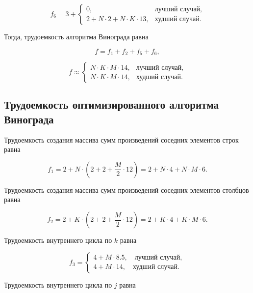 \begin{equation}
	f_6 = 3 + \begin{cases}
		0, & \text{лучший случай}, \\
		2 + N \cdot 2 + N \cdot K \cdot 13, & \text{худший случай}.
	\end{cases}
\end{equation}

Тогда, трудоемкость алгоритма Винограда равна

\begin{equation}
	f = f_1 + f_2 + f_5 + f_6,
\end{equation}

\begin{equation}
	f \approx \begin{cases}
		N \cdot K \cdot M \cdot 14, & \text{лучший случай}, \\
		N \cdot K \cdot M \cdot 14, & \text{худший случай}.
	\end{cases}
\end{equation}

\subsection{Трудоемкость оптимизированного алгоритма Винограда}

Трудоемкость создания массива сумм произведений соседних элементов строк равна

\begin{equation}
	f_1 = 2 + N \cdot (2 + 2 + \frac{M}{2} \cdot 12) = 2 + N \cdot 4 + N \cdot M \cdot 6.
\end{equation}

Трудоемкость создания массива сумм произведений соседних элементов столбцов равна

\begin{equation}
	f_2 = 2 + K \cdot (2 + 2 + \frac{M}{2} \cdot 12) = 2 + K \cdot 4 + K \cdot M \cdot 6.
\end{equation}

Трудоемкость внутреннего цикла по $k$ равна

\begin{equation}
	f_3 = \begin{cases}
		4 + M \cdot 8.5, \quad \text{лучший случай}, \\
		4 + M \cdot 14, \quad \text{худший случай}.
	\end{cases}
\end{equation}

Трудоемкость внутреннего цикла по $j$ равна

